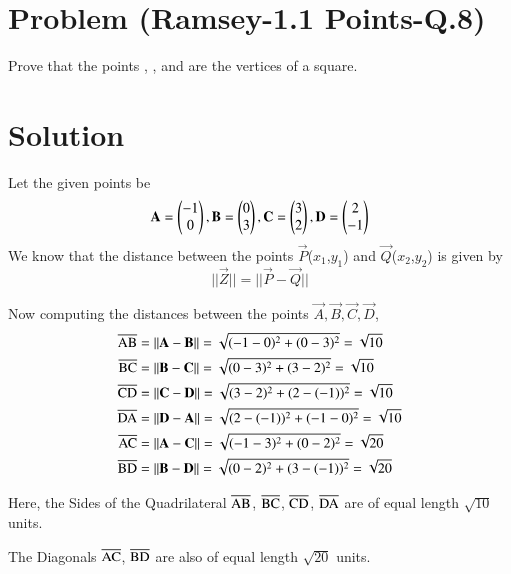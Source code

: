 \documentclass[journal,12pt,twocolumn]{IEEEtran}
\begin{document}
\section*{\textbf{Problem (Ramsey-1.1 Points-Q.8)}}
Prove that the points , ,  and  are the vertices of a square.
\section*{Solution}
Let the given points be
\begin{equation}
\vec{A} = \myvec{-1\\0}, \vec{B} = \myvec{0\\3}, \vec{C} = \myvec{3\\2}, \vec{D} = \myvec{2\\-1}
\end{equation}
We know that the distance between the points $\vec{P}$($x_1$,$y_1$) and $\vec{Q}$($x_2$,$y_2$) is given by
\begin{equation}
||\vec{Z}|| = ||\vec{P} - \vec{Q}||
\end{equation}

Now computing the distances between the points $\vec{A},\vec{B},\vec{C},\vec{D}$,
\begin{align}
    \overline{\rm AB} &= ||\vec{A} - \vec{B}|| = \sqrt{(-1-0)^2 + (0-3)^2} = \sqrt{10}\\
    \overline{\rm BC} &= ||\vec{B} - \vec{C}|| = \sqrt{(0-3)^2 + (3-2)^2} = \sqrt{10}\\
    \overline{\rm CD} &= ||\vec{C} - \vec{D}|| = \sqrt{(3-2)^2 + (2-(-1))^2} = \sqrt{10}\\
    \overline{\rm DA} &= ||\vec{D} - \vec{A}|| = \sqrt{(2-(-1))^2 + (-1-0)^2} = \sqrt{10}\\
    \overline{\rm AC} &= ||\vec{A} - \vec{C}|| = \sqrt{(-1-3)^2 + (0-2)^2} = \sqrt{20}\\
    \overline{\rm BD} &= ||\vec{B} - \vec{D}|| = \sqrt{(0-2)^2 + (3-(-1))^2} = \sqrt{20}
\end{align}

Here, the Sides of the Quadrilateral $\overline{\rm AB}$, $\overline{\rm BC}$, $\overline{\rm CD}$, $\overline{\rm DA}$ are of equal length $\sqrt{10}$ units.

The Diagonals $\overline{\rm AC}$, $\overline{\rm BD}$ are also of equal length $\sqrt{20}$ units.\\
\end{document}
